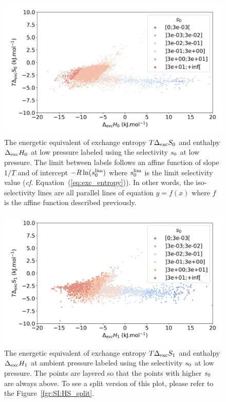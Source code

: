 \documentclass[main.tex]{subfiles}
\begin{document}
\begin{figure}[t]
\centering
  \includegraphics[width=0.6\linewidth]{figures/2-thermo/enthalpy_entropy_0_s_0.jpg}
  \caption{The energetic equivalent of exchange entropy $T\Delta_{\text{exc}}S_{\text{0}}$ and enthalpy $\Delta_{\text{exc}}H_{\text{0}}$ at low pressure labeled using the selectivity $s_{\text{0}}$ at low pressure. The limit between labels follows an affine function of slope $1/T$ and of intercept $-R\ln(s_{\text{0}}^{\text{lim}})$ where $s_{\text{0}}^{\text{lim}}$ is the limit selectivity value (\emph{cf.} Equation~(\ref{eq:exc_entropy})). In other words, the iso-selectivity lines are all parallel lines of equation $y=f(x)$ where $f$ is the affine function described previously.}\label{fgr:HSplot_0}
\end{figure}


\begin{figure}[t]
\centering
  \includegraphics[width=0.6\linewidth]{figures/2-thermo/enthalpy_entropy_2080_s_0.jpg}
  \caption{The energetic equivalent of exchange entropy $T\Delta_{\text{exc}}S_{\text{1}}$ and enthalpy $\Delta_{\text{exc}}H_{\text{1}}$ at ambient pressure labeled using the selectivity $s_{\text{0}}$ at low pressure. The points are layered so that the points with higher $s_{\text{0}}$ are always above. To see a split version of this plot, please refer to the Figure~\ref{fgr:SI:HS_split}.}\label{fgr:HSplot_1}
\end{figure}
\end{document}
